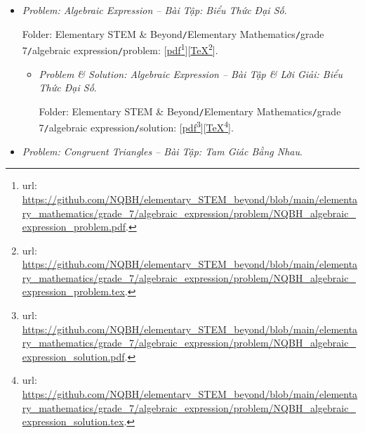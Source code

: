 \documentclass[12pt]{article}
\begin{document}
\begin{itemize}
\begin{itemize}
		Folder: {\sf Elementary STEM \& Beyond{\tt/}Elementary Mathematics{\tt/}grade 7{\tt/}probability \& statistics{\tt/}solution}: [\href{https://github.com/NQBH/elementary_STEM_beyond/blob/main/elementary_mathematics/grade_7/probability_statistics/solution/NQBH_probability_statistics_solution.pdf}{pdf}\footnote{{\sc url}: \url{https://github.com/NQBH/elementary_STEM_beyond/blob/main/elementary_mathematics/grade_7/probability_statistics/solution/NQBH_probability_statistics_solution.pdf}.}][\href{https://github.com/NQBH/elementary_STEM_beyond/blob/main/elementary_mathematics/grade_7/probability_statistics/solution/NQBH_probability_statistics_solution.tex}{\TeX}\footnote{{\sc url}: \url{https://github.com/NQBH/elementary_STEM_beyond/blob/main/elementary_mathematics/grade_7/probability_statistics/solution/NQBH_probability_statistics_solution.tex}.}].
	\end{itemize}	
	
	\item {\it Problem: Algebraic Expression -- Bài Tập: Biểu Thức Đại Số}.
	
	Folder: {\sf Elementary STEM \& Beyond{\tt/}Elementary Mathematics{\tt/}grade 7{\tt/}algebraic expression{\tt/}problem}: [\href{https://github.com/NQBH/elementary_STEM_beyond/blob/main/elementary_mathematics/grade_7/algebraic_expression/problem/NQBH_algebraic_expression_problem.pdf}{pdf}\footnote{{\sc url}: \url{https://github.com/NQBH/elementary_STEM_beyond/blob/main/elementary_mathematics/grade_7/algebraic_expression/problem/NQBH_algebraic_expression_problem.pdf}.}][\href{https://github.com/NQBH/elementary_STEM_beyond/blob/main/elementary_mathematics/grade_7/algebraic_expression/problem/NQBH_algebraic_expression_problem.tex}{\TeX}\footnote{{\sc url}: \url{https://github.com/NQBH/elementary_STEM_beyond/blob/main/elementary_mathematics/grade_7/algebraic_expression/problem/NQBH_algebraic_expression_problem.tex}.}].
	\begin{itemize}
		\item {\it Problem \& Solution: Algebraic Expression -- Bài Tập \& Lời Giải: Biểu Thức Đại Số}.
		
		Folder: {\sf Elementary STEM \& Beyond{\tt/}Elementary Mathematics{\tt/}grade 7{\tt/}algebraic expression{\tt/}solution}: [\href{https://github.com/NQBH/elementary_STEM_beyond/blob/main/elementary_mathematics/grade_7/algebraic_expression/problem/NQBH_algebraic_expression_solution.pdf}{pdf}\footnote{{\sc url}: \url{https://github.com/NQBH/elementary_STEM_beyond/blob/main/elementary_mathematics/grade_7/algebraic_expression/problem/NQBH_algebraic_expression_solution.pdf}.}][\href{https://github.com/NQBH/elementary_STEM_beyond/blob/main/elementary_mathematics/grade_7/algebraic_expression/problem/NQBH_algebraic_expression_solution.tex}{\TeX}\footnote{{\sc url}: \url{https://github.com/NQBH/elementary_STEM_beyond/blob/main/elementary_mathematics/grade_7/algebraic_expression/problem/NQBH_algebraic_expression_solution.tex}.}].
	\end{itemize}
	\item {\it Problem: Congruent Triangles -- Bài Tập: Tam Giác Bằng Nhau}.
	

\end{itemize}
\end{document}
